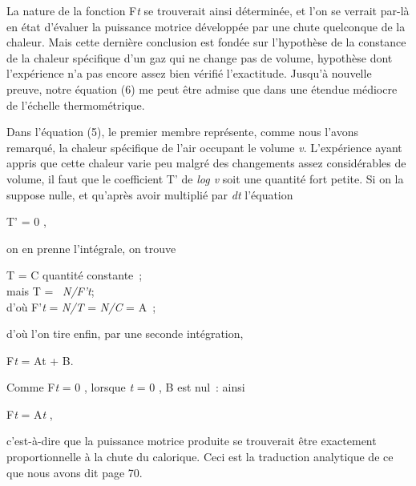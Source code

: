 \documentclass[french,twoside]{book} %
\begin{document}
{ \noindent La nature de la fonction F\emph{t} se trouverait ainsi déterminée, et l’on se verrait par-là en état d’évaluer la puissance motrice développée par une chute quelconque de la chaleur. Mais cette dernière conclusion est fondée sur l’hypothèse de la constance de la chaleur spécifique d’un gaz qui ne change pas de volume, hypothèse dont l’expérience n’a pas encore assez bien vérifié l’exactitude. Jusqu’à nouvelle preuve, notre équation (6) me peut être admise que dans une étendue médiocre de l’échelle thermométrique.\par
 Dans l’équation (5), le premier membre représente, comme nous l’avons remarqué, la chaleur spécifique de l’air occupant le volume \emph{v}. L’expérience ayant appris que cette chaleur varie peu malgré des changements assez considérables de volume, il faut que le coefficient T’ de \emph{log v} soit une quantité fort petite. Si on la suppose nulle, et qu’après avoir multiplié par \emph{dt} l’équation\par
 
\begin{center}
\noindent T’ = 0 ,\par
\end{center}

 \noindent on en prenne l’intégrale, on trouve\par
 
\begin{center}
\noindent T = C quantité constante ; \\
mais T =  \emph{N/F’t}; \\
d’où F’\emph{t} = \emph{N/T} = \emph{N/C} = A ;\par
\end{center}

 \noindent d’où l’on tire enfin, par une seconde intégration,\par
 
\begin{center}
\noindent F\emph{t} = At + B.\par
\end{center}

 \noindent Comme F\emph{t} = 0 , lorsque \emph{t} = 0 , B est nul : ainsi\par
 
\begin{center}
\noindent F\emph{t} = A\emph{t} ,\par
\end{center}

 \noindent c’est-à-dire que la puissance motrice produite se trouverait être exactement proportionnelle à la chute du calorique. Ceci est la traduction analytique de ce que nous avons dit page 70.
 }\par
\end{document}
